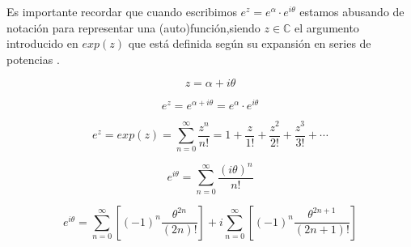 \documentclass[preview]{standalone}
\begin{document}
\begin{center}
Es importante recordar que cuando  escribimos $e^{z}=e^{\alpha}\cdot e^{i\theta}$ estamos abusando de notación para representar una (auto)función,siendo $z  \in \mathbb{C}$ el argumento introducido en $exp(z)$ que está definida según su expansión en series de potencias . 

$$z = \alpha + i\theta $$

$$e^{z}=e^{\alpha+i\theta}=e^{\alpha}\cdot e^{i\theta}$$

$$e^z=exp(z)=\sum_{n=0}^{\infty} \frac{z^n}{n!} = 1 + \frac{z}{1!} + \frac{z^2}{2!} + \frac{z^3}{3!} + \cdots$$


$$e^{i\theta}= \sum_{n=0}^{\infty} \frac{(i \theta)^n}{n!} $$

$$e^{i\theta}=\sum_{n=0}^{\infty} \left[ \left(-1\right)^n \frac{\theta^{2n}}{(2n)!} \right] + i \sum_{n=0}^{\infty} \left[ \left(-1\right)^n \frac{\theta^{2n+1}}{(2n+1)!} \right]$$
\end{center}
\end{document}
